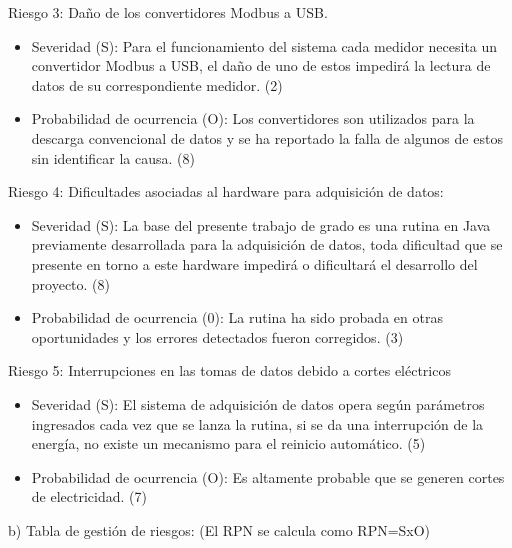 \documentclass[
11pt, %
codirector, %
]{charter}
\begin{document}
Riesgo 3: Daño de los convertidores Modbus a USB.

\begin{itemize}
	\item Severidad (S): Para el funcionamiento del sistema cada medidor necesita un convertidor Modbus a USB, el daño de uno de estos impedirá la lectura de datos de su correspondiente medidor. (2)  \\
	
	\item Probabilidad de ocurrencia (O): Los convertidores son utilizados para la descarga convencional de datos y se ha reportado la falla de algunos de estos sin identificar la causa. (8)
\end{itemize}   


Riesgo 4: Dificultades asociadas al hardware para adquisición de datos:

\begin{itemize}
	\item Severidad (S): La base del presente trabajo de grado es una rutina en Java previamente desarrollada para la adquisición de datos, toda dificultad que se presente en torno a este hardware impedirá o dificultará el desarrollo del proyecto. (8)  \\
	
	\item Probabilidad de ocurrencia (0): La rutina ha sido probada en otras oportunidades y los errores detectados fueron corregidos. (3)
\end{itemize}  


Riesgo 5: Interrupciones en las tomas de datos debido a cortes eléctricos 

\begin{itemize}
	\item Severidad (S): El sistema de adquisición de datos opera según parámetros ingresados cada vez que se lanza la rutina, si se da una interrupción de la energía, no existe un mecanismo para el reinicio automático.  (5) \\
	
	\item Probabilidad de ocurrencia (O): Es altamente probable que se generen cortes de electricidad. (7)
\end{itemize}  


b) Tabla de gestión de riesgos:      (El RPN se calcula como RPN=SxO)
\end{document}
